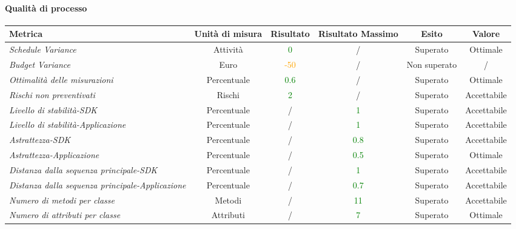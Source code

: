 \paragraph{Qualità di processo}
\begin{longtable}{|>{\centering}m{5cm}|c|c|c|c|c|}
\hline
\textbf{Metrica} & \textbf{Unità di misura} & \textbf{Risultato} & \textbf{Risultato Massimo} & \textbf{Esito} & \textbf{Valore}\\
\hline
\endhead

\emph{Schedule Variance} & {Attività} & \textcolor{Green}{0} & / & Superato & Ottimale\\ \hline
\emph{Budget Variance} & {Euro} & \textcolor{Orange}{-50} & / & Non superato & /\\ \hline
\emph{Ottimalità delle misurazioni} & {Percentuale} & \textcolor{Green}{0.6} & / & Superato & Ottimale \\ \hline
\emph{Rischi non preventivati} & {Rischi} & \textcolor{Green}{2} & / & Superato & Accettabile\\ \hline
\emph{Livello di stabilità-SDK} & {Percentuale} & / &\textcolor{Green}{1} & Superato & Accettabile\\ \hline
\emph{Livello di stabilità-Applicazione} & {Percentuale} & / &\textcolor{Green}{1} & Superato & Accettabile\\ \hline
\emph{Astrattezza-SDK} & {Percentuale} & / &\textcolor{Green}{0.8} & Superato & Accettabile\\ \hline
\emph{Astrattezza-Applicazione} & {Percentuale} & / &\textcolor{Green}{0.5} & Superato & Ottimale\\ \hline
\emph{Distanza dalla sequenza principale-SDK} & {Percentuale} & / &\textcolor{Green}{1} & Superato & Accettabile\\ \hline
\emph{Distanza dalla sequenza principale-Applicazione} & {Percentuale} & / &\textcolor{Green}{0.7} & Superato & Accettabile\\ \hline
\emph{Numero di metodi per classe} & {Metodi} & / &\textcolor{Green}{11} & Superato & Accettabile\\ \hline
\emph{Numero di attributi per classe} & {Attributi} & / &\textcolor{Green}{7} & Superato & Ottimale\\ \hline

\end{longtable}
